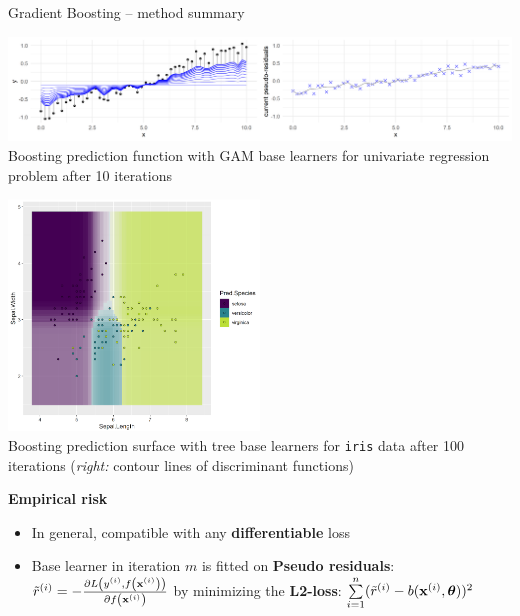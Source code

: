 \documentclass[11pt,compress,t,notes=noshow, xcolor=table]{beamer}
\newcommand{\highlight}[1]{\textcolor{hlcol}{\textbf{#1}}}
\begin{document}
\begin{frame2}{Gradient Boosting -- method summary}
\begin{minipage}{0.45\textwidth}
  \centering
  \includegraphics[width=\textwidth, trim=0 0 450 0, clip]{
  figure/illustration_gaussian_huber_2_10} \\
  \tiny{Boosting prediction function with GAM base learners for univariate 
  regression problem after 10 iterations}
\end{minipage}%
\hfill
\begin{minipage}{0.45\textwidth}
  \centering
  \includegraphics[width=0.5\textwidth]{
  figure/boosting_multiclass_100_single} \\
  \tiny{Boosting prediction surface with tree base learners for \texttt{iris} 
  data after 100 iterations (\textit{right:} contour lines of discriminant 
  functions)}
\end{minipage}

\framebreak

\footnotesize

\highlight{Empirical risk}

\begin{itemize}
  \item In general, compatible with any \textbf{differentiable} loss
  \item Base learner in iteration $m$ is fitted on \textbf{Pseudo residuals}: \\
  $\tilde{r}^{(i)} = - \frac{\partial{L\left(y^{(i)}, f\left(\mathbf{x}^{(i)}\right)\right)}}{\partial f\left(\mathbf{x}^{(i)}\right)}$ by minimizing the \textbf{L2-loss}: $\sum\limits_{i=1}^n (\tilde{r}^{(i)} - b(\mathbf{x}^{(i)}, \bm{\theta}))^2$
\end{itemize}


\end{frame2}
\end{document}
